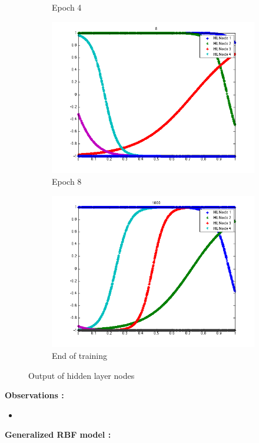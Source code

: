\documentclass{article}
\begin{document}
\begin{figure}
\begin{subfigure}{.5\textwidth}
  \caption{Epoch 4}
\end{subfigure}%
\begin{subfigure}{.5\textwidth}
  \centering
  \includegraphics[width=.8\linewidth]{Regression/univariate/hiddenLayer_8.png}
   \caption{Epoch 8}
  \end{subfigure}
  
  \begin{subfigure}{0.5\textwidth}
  \centering
  \includegraphics[width=0.8\linewidth]{Regression/univariate/hiddenLayer_1000.png}
   \caption{End of training}
  \end{subfigure}
  
\caption{Output of hidden layer nodes}
\end{figure}


\textbf{Observations :}

\begin{itemize}
\item
\end{itemize}
\textbf{Generalized RBF model :}
\end{document}
